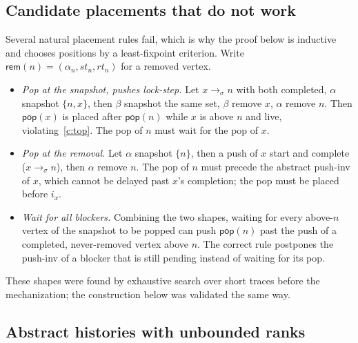 \documentclass[11pt]{article}
\theoremstyle{definition}
\theoremstyle{remark}
\newcommand{\conc}{\sigma}
\newcommand{\rem}{\mathsf{rem}}
\newcommand{\pop}{\mathsf{pop}}
\begin{document}
\subsection{Candidate placements that do not work}

Several natural placement rules fail, which is why the proof below is
inductive and chooses positions by a least-fixpoint criterion.  Write
\(\rem(n)=(\alpha_n,st_n,rt_n)\) for a removed vertex.
\begin{itemize}[nosep]
\item \emph{Pop at the snapshot, pushes lock-step.}  Let \(x\to_\conc n\)
  with both completed, \(\alpha\) snapshot \(\{n,x\}\), then \(\beta\)
  snapshot the same set, \(\beta\) remove \(x\), \(\alpha\) remove \(n\).
  Then \(\pop(x)\) is placed after \(\pop(n)\) while \(x\) is above \(n\)
  and live, violating~\ref{c:top}.  The pop of \(n\) must wait for the pop
  of \(x\).
\item \emph{Pop at the removal.}  Let \(\alpha\) snapshot \(\{n\}\), then a
  push of \(x\) start and complete (\(x\to_\conc n\)), then \(\alpha\)
  remove \(n\).  The pop of \(n\) must precede the abstract push-inv of
  \(x\), which cannot be delayed past \(x\)'s completion; the pop must be
  placed before \(i_x\).
\item \emph{Wait for all blockers.}  Combining the two shapes, waiting for
  every above-\(n\) vertex of the snapshot to be popped can push
  \(\pop(n)\) past the push of a completed, never-removed vertex above
  \(n\).  The correct rule postpones the push-inv of a blocker that is still
  pending instead of waiting for its pop.
\end{itemize}
These shapes were found by exhaustive search over short traces before the
mechanization; the construction below was validated the same way.

\subsection{Abstract histories with unbounded ranks}
\end{document}
